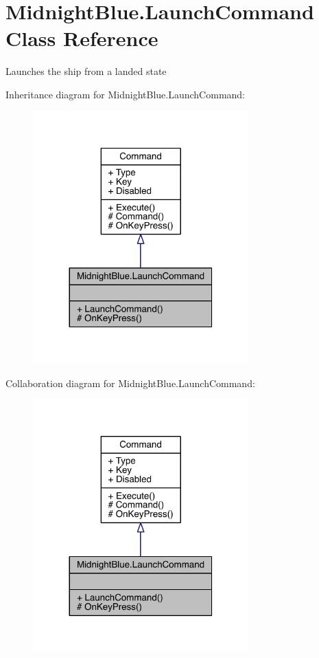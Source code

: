 \hypertarget{class_midnight_blue_1_1_launch_command}{}\section{Midnight\+Blue.\+Launch\+Command Class Reference}
\label{class_midnight_blue_1_1_launch_command}


Launches the ship from a landed state  




Inheritance diagram for Midnight\+Blue.\+Launch\+Command\+:\nopagebreak
\begin{figure}[H]
\begin{center}
\leavevmode
\includegraphics[width=236pt]{class_midnight_blue_1_1_launch_command__inherit__graph}
\end{center}
\end{figure}


Collaboration diagram for Midnight\+Blue.\+Launch\+Command\+:\nopagebreak
\begin{figure}[H]
\begin{center}
\leavevmode
\includegraphics[width=236pt]{class_midnight_blue_1_1_launch_command__coll__graph}
\end{center}
\end{figure}
